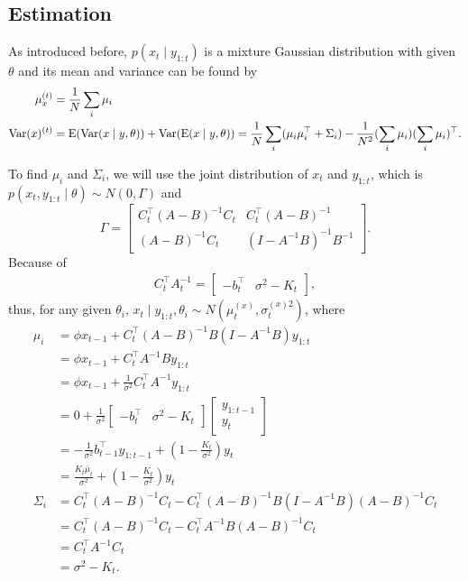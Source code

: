 \subsection*{Estimation}

As introduced before, $p(x_t \mid y_{1:t})$ is a mixture Gaussian distribution with given $\theta$ and its mean and variance can be found by 
\begin{align}
\mu_x^{(t)} &= \frac{1}{N} \sum_i \mu_i\\
\mathrm{Var}(x)^{(t)}  &= \mathrm{E}(\mathrm{Var}(x\mid y,\theta)) + \mathrm{Var}(\mathrm{E}(x\mid y,\theta)) = \frac{1}{N} \sum_i (\mu_i \mu_i^\top +\Sigma_i) -\frac{1}{N^2} (\sum_i  \mu_i) (\sum_i \mu_i)^\top. 
\end{align}

To find $\mu_i$ and $\Sigma_i$, we will use the joint distribution of $x_{t}$ and $y_{1:t}$, which is $p(x_{t}, y_{1:t}  \mid  \theta)\sim N(0,\Gamma)$ and 
\begin{equation*}
\Gamma=\begin{bmatrix} C_{t}^\top(A-B)^{-1}C_{t} & C_{t}^\top(A-B)^{-1}\\(A-B)^{-1}C_{t} & (I-A^{-1}B)^{-1}B^{-1} \end{bmatrix}.
\end{equation*}
Because of 
\begin{align*}
C_{t}^\top A_{t}^{-1} = \left[\begin{matrix} - b_{t}^\top & \sigma^2- K_{t} \end{matrix} \right],
\end{align*}
thus, for any given $\theta_i$, $x_{t}\mid y_{1:t},\theta_i \sim N(\mu_{t}^{(x)},\sigma_{t}^{(x)2})$, where
\begin{align*}
\mu_i  &= \phi \hat{x}_{t-1} +  C_{t}^\top (A-B)^{-1}B (I-A^{-1}B)y_{1:t}\\
                      &= \phi \hat{x}_{t-1} +  C_{t}^\top A^{-1}B y_{1:t} \\ &= \phi \hat{x}_{t-1} +  \frac{1}{\sigma^2}C_{t}^\top A^{-1} y_{1:t}\\
                      &=0+  \frac{1}{\sigma^2}\left[\begin{matrix} - b_{t}^\top & \sigma^2- K_{t} \end{matrix} \right]  \left[\begin{matrix} y_{1:t-1} \\ y_{t} \end{matrix} \right] \\
                      &= - \frac{1}{\sigma^2}b_{t-1}^\top y_{1:t-1}+(1-\frac{K_{t}}{\sigma^2})y_{t}\\
                      &=\frac{K_{t}\bar{\mu}_{t}}{\sigma^2}+(1-\frac{K_{t}}{\sigma^2})y_{t} \\
\Sigma_i&=C_{t}^\top(A-B)^{-1}C_{t}-  C_{t}^\top(A-B)^{-1}  B(I-A^{-1}B) (A-B)^{-1}C_{t}\\
                      &= C_{t}^\top(A-B)^{-1}C_{t} -  C_{t}^\top A^{-1}B(A-B)^{-1}C_{t}\\
                      &= C_{t}^\top A^{-1}C_{t} \\ &= \sigma^2-K_{t}.
\end{align*}
